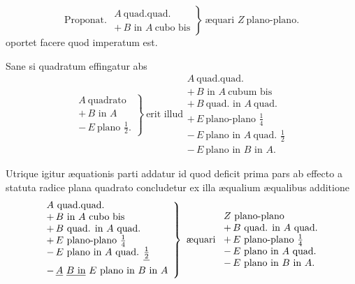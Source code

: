 \documentclass[11pt,a4paper]{article}
\begin{document}
\[ \text{Proponat. } \left.\begin{array}{l} A\ \text{quad.quad.} \\ +\,B \text{ in } A\ \text{cubo bis} \end{array}\right\}\ \text{æquari } Z\ \text{plano-plano.} \]
oportet facere quod imperatum est.

Sane si quadratum effingatur abs
\[ \left.\begin{array}{l} A\ \text{quadrato} \\ +\,B \text{ in } A \\ -\,E\ \text{plano } \frac{1}{2}. \end{array}\right\}\ \text{erit illud} \begin{array}{l} A\ \text{quad.quad.} \\ +\,B \text{ in } A\ \text{cubum bis} \\ +\,B\ \text{quad. in } A\ \text{quad.} \\ +\,E\ \text{plano-plano } \frac{1}{4} \\ -\,E\ \text{plano in } A\ \text{quad. } \frac{1}{2} \\ -\,E\ \text{plano in } B \text{ in } A. \end{array} \]

Utrique igitur æquationis parti addatur id quod deficit prima pars ab effecto a statuta radice plana quadrato concludetur ex illa æqualium æqualibus additione
\[ \left.\begin{array}{l} A\ \text{quad.quad.} \\ +\,B \text{ in } A\ \text{cubo bis} \\ +\,B\ \text{quad. in } A\ \text{quad.} \\ +\,E\ \text{plano-plano } \frac{1}{4} \\ -\,E\ \text{plano in } A\ \text{quad. } \struck{\frac{1}{2}} \\ -\,\struck{A}\ \struck{B \text{ in}}\ E\ \text{plano in } B \text{ in } A \end{array}\right\}\ \text{æquari } \begin{array}{l} Z\ \text{plano-plano} \\ +\,B\ \text{quad. in } A\ \text{quad.} \\ +\,E\ \text{plano-plano } \frac{1}{4} \\ -\,E\ \text{plano in } A\ \text{quad.} \\ -\,E\ \text{plano in } B \text{ in } A. \end{array} \]
\end{document}
